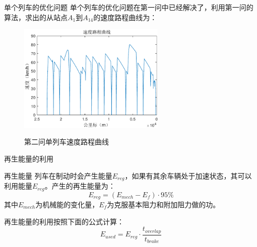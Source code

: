 \documentclass{beamer}
\begin{document}
\begin{frame}{单个列车的优化问题}
单个列车的优化问题在第一问中已经解决了，利用第一问的算法，求出的从站点$A_1$到$A_{14}$的速度路程曲线为：
\begin{figure}
  \centering
  \includegraphics[width=7cm]{fig/fig11/fig11.pdf}\\
  \caption{第二问单列车速度路程曲线}
\end{figure}
\end{frame}

\begin{frame}{再生能量的利用}

\begin{block}{再生能量}
列车在制动时会产生能量$E_{reg}$，如果有其余车辆处于加速状态，其可以利用能量$E_{reg}$。产生的再生能量为：
$$E_{reg} = (E_{mech} - E_f) \cdot 95 \%$$
其中$E_{mech}$为机械能的变化量，$E_f$为克服基本阻力和附加阻力做的功。
\end{block}

再生能量的利用按照下面的公式计算：
$$E_{used} = E_{reg} \cdot \frac{t_{overlap}}{t_{brake}}$$

\end{frame}
\end{document}

